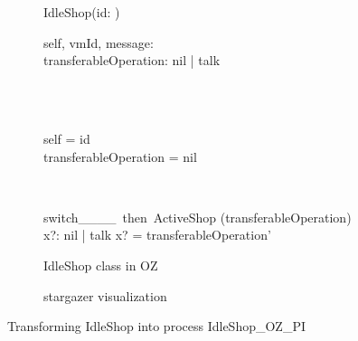 \begin{figure}[H]
\begin{subfigure}{.6\textwidth}
\centering
\begin{class}{IdleShop(id: \integer)}
\\
\begin{state}
self, vmId, message: \integer
\\transferableOperation: nil | talk
\end{state} 
\\
\begin{init}
\\self = id
\\transferableOperation = nil
\end{init} 
\\
\begin{op}{switch\_\_\_\_\ then\ ActiveShop}
\Delta (transferableOperation)
\\x?: nil | talk
\ST
x? = transferableOperation'
\end{op}
\end{class}
  \caption{IdleShop class in OZ}
\end{subfigure}%
\begin{subfigure}{.4\textwidth}
  \centering
{}
  \caption{stargazer visualization}
\end{subfigure}
\caption{Transforming IdleShop into \picalc{} process IdleShop\_OZ\_PI}
\label{tra_idleShop_OZ}
\end{figure}

